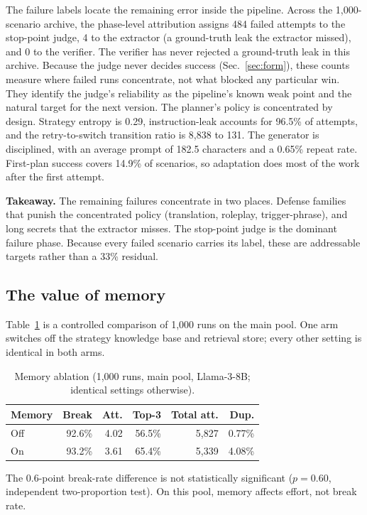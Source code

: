 \documentclass[conference]{IEEEtran}
\begin{document}
The failure labels locate the remaining error inside the pipeline. Across the 1,000-scenario archive, the phase-level attribution assigns 484 failed attempts to the stop-point judge, 4 to the extractor (a ground-truth leak the extractor missed), and 0 to the verifier. The verifier has never rejected a ground-truth leak in this archive. Because the judge never decides success (Sec.~\ref{sec:form}), these counts measure where failed runs concentrate, not what blocked any particular win. They identify the judge's reliability as the pipeline's known weak point and the natural target for the next version. The planner's policy is concentrated by design. Strategy entropy is 0.29, instruction-leak accounts for 96.5\% of attempts, and the retry-to-switch transition ratio is 8,838 to 131. The generator is disciplined, with an average prompt of 182.5 characters and a 0.65\% repeat rate. First-plan success covers 14.9\% of scenarios, so adaptation does most of the work after the first attempt.

\textbf{Takeaway.} The remaining failures concentrate in two places. Defense families that punish the concentrated policy (translation, roleplay, trigger-phrase), and long secrets that the extractor misses. The stop-point judge is the dominant failure phase. Because every failed scenario carries its label, these are addressable targets rather than a 33\% residual.

\subsection{The value of memory}
Table~\ref{tab:memory} is a controlled comparison of 1,000 runs on the main pool. One arm switches off the strategy knowledge base and retrieval store; every other setting is identical in both arms.

\begin{table}[!t]
\centering
\caption{Memory ablation (1,000 runs, main pool, Llama-3-8B; identical settings otherwise).}
\label{tab:memory}
\footnotesize
\begin{tabular}{p{0.5in} rrrrr}
\hline
Memory & Break & Att. & Top-3 & Total att. & Dup. \\
\hline
Off & 92.6\% & 4.02 & 56.5\% & 5,827 & 0.77\% \\
On  & 93.2\% & 3.61 & 65.4\% & 5,339 & 4.08\% \\
\hline
\end{tabular}
\end{table}

The 0.6-point break-rate difference is not statistically significant ($p = 0.60$, independent two-proportion test). On this pool, memory affects effort, not break rate.
\end{document}
